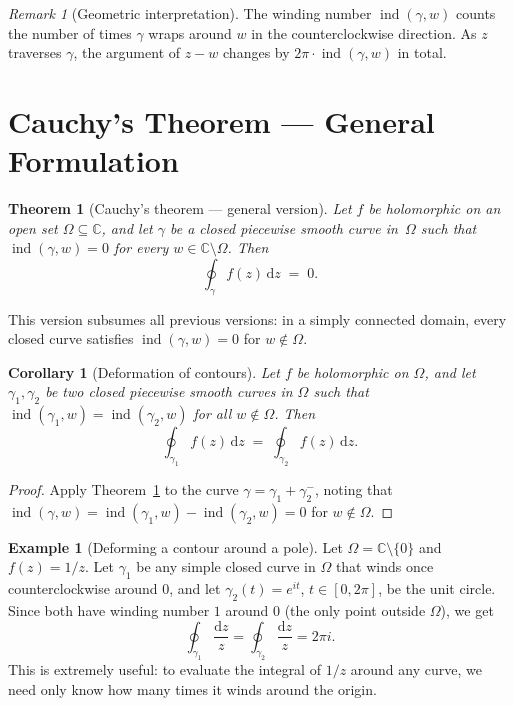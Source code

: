 \documentclass[12pt,a4paper,openany]{book}
\theoremstyle{definition}
\newtheorem{example}[definition]{Example}
\theoremstyle{plain}
\newtheorem{theorem}[definition]{Theorem}
\newtheorem{corollary}[definition]{Corollary}
\theoremstyle{remark}
\newtheorem{remark}[definition]{Remark}
\newcommand{\C}{\mathbb{C}}
\DeclareMathOperator{\ind}{ind}
\newcommand{\dd}{\mathrm{d}}
\begin{document}
\begin{remark}[Geometric interpretation]\label{rem:winding-geometric}
The winding number $\ind(\gamma,w)$ counts the number of times $\gamma$ wraps
around $w$ in the counterclockwise direction.  As $z$ traverses $\gamma$, the
argument of $z-w$ changes by $2\pi\cdot\ind(\gamma,w)$ in total.
\end{remark}

\section{Cauchy's Theorem --- General Formulation}
\label{sec:cauchy-general}

\begin{theorem}[Cauchy's theorem --- general version]\label{thm:cauchy-general}
Let $f$ be holomorphic on an open set $\Omega\subseteq\C$, and let
$\gamma$ be a closed piecewise smooth curve in~$\Omega$ such that
$\ind(\gamma,w)=0$ for every $w\in\C\setminus\Omega$.  Then
\[
  \oint_\gamma f(z)\,\dd z \;=\; 0.
\]
\end{theorem}

This version subsumes all previous versions: in a simply connected domain,
every closed curve satisfies $\ind(\gamma,w)=0$ for $w\notin\Omega$.

\begin{corollary}[Deformation of contours]\label{cor:deformation-contours}
Let $f$ be holomorphic on $\Omega$, and let $\gamma_1,\gamma_2$ be two closed
piecewise smooth curves in $\Omega$ such that $\ind(\gamma_1,w) = \ind(\gamma_2,w)$
for all $w\notin\Omega$.  Then
\[
  \oint_{\gamma_1}f(z)\,\dd z \;=\; \oint_{\gamma_2}f(z)\,\dd z.
\]
\end{corollary}

\begin{proof}
Apply Theorem~\ref{thm:cauchy-general} to the curve $\gamma = \gamma_1 + \gamma_2^-$,
noting that $\ind(\gamma,w)=\ind(\gamma_1,w)-\ind(\gamma_2,w)=0$ for $w\notin\Omega$.
\end{proof}

\begin{example}[Deforming a contour around a pole]\label{ex:deformation-around-pole}
Let $\Omega = \C\setminus\{0\}$ and $f(z)=1/z$.  Let $\gamma_1$ be any simple
closed curve in $\Omega$ that winds once counterclockwise around $0$, and let
$\gamma_2(t)=e^{it}$, $t\in[0,2\pi]$, be the unit circle.  Since both have
winding number $1$ around $0$ (the only point outside $\Omega$), we get
\[
  \oint_{\gamma_1}\frac{\dd z}{z} = \oint_{\gamma_2}\frac{\dd z}{z} = 2\pi i.
\]
This is extremely useful: to evaluate the integral of $1/z$ around any curve,
we need only know how many times it winds around the origin.
\end{example}
\end{document}
